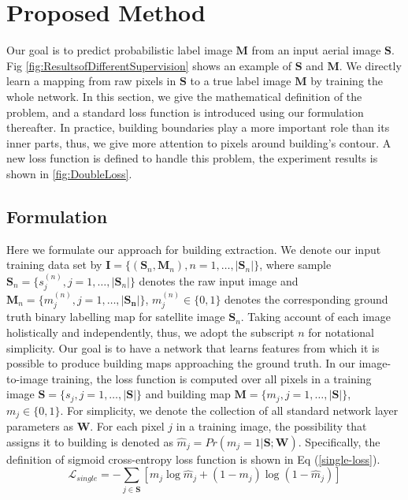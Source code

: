 \documentclass[runningheads]{llncs}
\begin{document}
\section{Proposed Method}
    Our goal is to predict probabilistic label image $\mathbf{M}$ from an input aerial image $\mathbf{S}$. Fig \ref{fig:ResultsofDifferentSupervision} shows an example of $\mathbf{S}$ and $\mathbf{M}$. We directly learn a mapping from raw pixels in $\mathbf{S}$ to a true label image  $\mathbf{M}$ by training the whole network. In this section, we give the mathematical definition of the problem, and a standard loss function is introduced using our formulation thereafter. In practice, building boundaries play a more important role than its inner parts, thus, we give more attention to pixels around building's contour. A new loss function is defined to handle this problem, the experiment results is shown in \ref{fig:DoubleLoss}.
    
\subsection{Formulation}
    Here we formulate our approach for building extraction. We denote our input training data set by $\mathbf{I} = \{(\mathbf{S}_{n},\mathbf{M}_{n}),n = 1,\ldots,\vert \mathbf{S}_n \vert \}$, where sample $\mathbf{S}_{n} = \{s_{j}^{(n)}, j = 1,\ldots,\vert \mathbf{S}_n \vert \}$ denotes the raw input image and  $\mathbf{M}_{n} = \{m_{j}^{(n)}, j = 1,\ldots,\vert \mathbf{S_n} \vert\}$, $m_j^{(n)} \in \{0,1\}$ denotes the corresponding ground truth binary labelling map for satellite image $\mathbf{S}_{n}$.  Taking account of each image holistically and independently, thus, we adopt the subscript $n$ for notational simplicity. Our goal is to have a network that learns features from which it is possible to produce building maps approaching the ground truth. 
    In our image-to-image training, the loss function is computed over all pixels in a training image $\mathbf{S} = \{s_{j}, j = 1,\ldots,\vert \mathbf{S} \vert\}$ and building map $\mathbf{M} = \{m_{j}, j = 1,\ldots,\vert \mathbf{S} \vert\}$, $m_j \in \{0,1\}$.
For simplicity, we denote the collection of all standard network layer parameters as $\mathbf{W}$. For each pixel $j$ in a training image, the possibility that assigns it to building is denoted as $\hat{m}_j = Pr(m_j = 1|\mathbf{S};\mathbf{W})$. Specifically, the definition of sigmoid cross-entropy loss function is shown in Eq (\ref{single-loss}).
\begin{equation}
	\label{single-loss}
    \mathcal{L}_{single} = - \sum_{j \in \mathbf{S}} \left[ m_j \log{\hat{m}_j} + (1 - m_j)\log{(1 - \hat{m}_j)} \right]
\end{equation}
\end{document}
